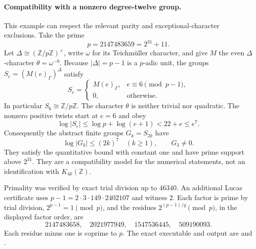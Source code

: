 \paragraph{Compatibility with a nonzero degree-twelve group.}
This example can respect the relevant parity and exceptional-character
exclusions.  Take the prime
\[
 p=2147483659=2^{31}+11.
\]
Let $\Delta\cong(\mathbb Z/p\mathbb Z)^\times$, write $\omega$
for its Teichm\"uller character, and give $M$ the even
$\Delta$-character $\theta=\omega^{-6}$.
Because $|\Delta|=p-1$ is a $p$-adic unit, the groups
$S_e=(M(e)_\Gamma)^\Delta$ satisfy
\[
 S_e=
 \begin{cases}
  M(e)_\Gamma,&e\equiv6\pmod{p-1},\\
  0,&\text{otherwise}.
 \end{cases}
 \tag{HU.8}
\]
In particular $S_6\cong\mathbb Z/p\mathbb Z$.
The character $\theta$ is neither trivial nor quadratic.
The nonzero positive twists start at $e=6$ and obey
\[
 \log|S_e|\le\log p+\log(e+1)<22+e\le e^7.
\]
Consequently the abstract finite groups $G_k=S_{2k}$ have
\[
 \log|G_k|\le(2k)^7\quad(k\ge1),\qquad G_3\ne0.
 \tag{HU.9}
\]
They satisfy the quantitative bound with constant one and have
prime support above $2^{31}$.  They are a compatibility model
for the numerical statements, not an identification with
$K_{4k}(\mathbb Z)$.

Primality was verified by exact trial division up to $46340$.
An additional Lucas certificate uses
$p-1=2\cdot3\cdot149\cdot2402107$ and witness $2$.
Each factor is prime by trial division,
$2^{p-1}=1\pmod p$, and the residues
$2^{(p-1)/q}\pmod p$, in the displayed factor order, are
\[
 2147483658,\quad2021977949,\quad1547536445,\quad509190093.
\]
Each residue minus one is coprime to $p$.
The exact executable and output are
 and
.

